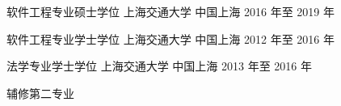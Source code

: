 

\begin{cventries}

  \cventry
    {软件工程专业硕士学位} %
    {上海交通大学} %
    {中国上海} %
    {2016 年至 2019 年} %
    {}

  \cventry
    {软件工程专业学士学位} %
    {上海交通大学} %
    {中国上海} %
    {2012 年至 2016 年} %
    {}

  \cventry
    {法学专业学士学位} %
    {上海交通大学} %
    {中国上海} %
    {2013 年至 2016 年} %
    {
      \begin{cvitems} %
      \item 辅修第二专业
      \end{cvitems}
    }
\end{cventries}

